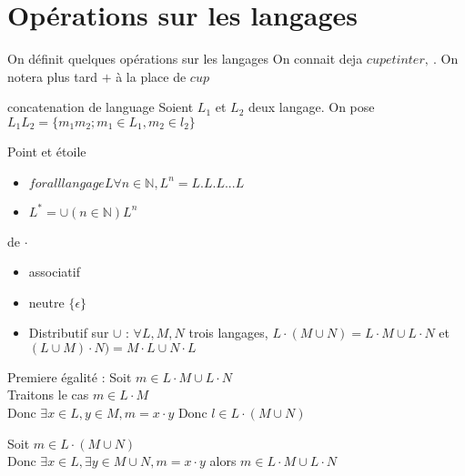
\section{Opérations sur les langages}

On définit quelques opérations sur les langages
On connait deja $cup et inter, \ $. On notera plus tard $+$ à la place de $cup$\\

\begin{defi} concatenation de language
    Soient $L_1$ et $L_2$ deux langage. On pose $L_1L_2=\{m_1m_2;m_1 \in L_1, m_2 \in l_2\}$
\end{defi}

\begin{ex}
    $\{ga,bu}\cdot {zo,meu}={gazo,gameu,buzo,bumeu}$    
\end{ex}

\begin{defi} Point et étoile
    \begin{itemize}
        \item $forall langage L \forall n \in \mathbb N, L^n=L.L.L...L$
        \item $L^*=\cup(n\in\mathbb N) L^n$
    \end{itemize}
\end{defi}

\begin{prop} de $\cdot$\\
    \begin{itemize}
        \item associatif
        \item neutre $\{\epsilon\}$
        \item Distributif sur $\cup$ : $\forall L,M,N$ trois langages, $L\cdot (M \cup N) = L\cdot M \cup L\cdot N$ et $(L\cup M) \cdot N) = M\cdot L \cup N\cdot L$
    \end{itemize}
\end{prop}

\begin{dem}
Premiere égalité : Soit $m\in L\cdot M \cup L \cdot N$\\
Traitons le cas $m \in L\cdot M$\\
Donc $\exists x \in L, y\in M,m=x\cdot y$
Donc $l\in L\cdot(M\cup N)$

Soit $m \in L\cdot(M\cup N)$\\
Donc $\exists x \in L,\exists y \in M \cup N, m=x\cdot y$ alors $m \in L\cdot M \cup L\cdot N$
\end{dem}

